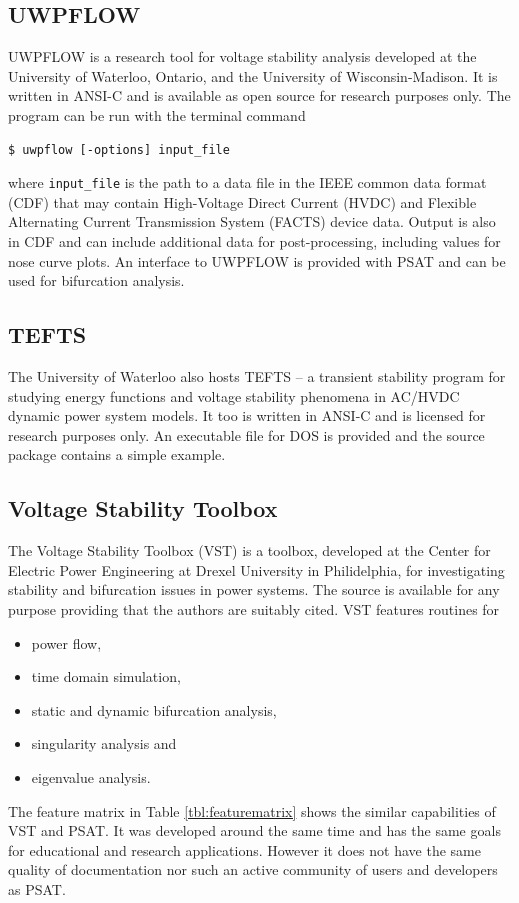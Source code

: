 \subsection*{UWPFLOW}
UWPFLOW is a research tool for voltage stability analysis developed at the
University of Waterloo, Ontario, and the University of Wisconsin-Madison.  It
is written in ANSI-C and is available as open source for research purposes
only. The program can be run with the terminal command
\begin{center}
\begin{verbatim}
$ uwpflow [-options] input_file
\end{verbatim}
\end{center}
where \texttt{input\_file} is the path to a data file in the IEEE common data
format (CDF) \cite{cdf:73} that may contain High-Voltage Direct Current (HVDC)
and Flexible Alternating Current Transmission System (FACTS) device data.
Output is also in CDF and can include additional data for post-processing,
including values for nose curve plots.  An interface to UWPFLOW is provided
with PSAT and can be used for bifurcation analysis.

\subsection*{TEFTS}
The University of Waterloo also hosts TEFTS -- a transient stability program
for studying energy functions and voltage stability phenomena in AC/HVDC
dynamic power system models.  It too is written in ANSI-C and is licensed for
research purposes only.  An executable file for DOS is provided and the source
package contains a simple example.

\subsection*{Voltage Stability Toolbox}
The Voltage Stability Toolbox (VST) is a \matlab toolbox, developed at the
Center for Electric Power Engineering at Drexel University in Philidelphia, for
investigating stability and bifurcation issues in power systems.  The source
is available for any purpose providing that the authors are suitably cited.
VST features routines for
\begin{itemize}
  \item power flow,
  \item time domain simulation,
  \item static and dynamic bifurcation analysis,
  \item singularity analysis and
  \item eigenvalue analysis.
\end{itemize}
The feature matrix in Table \ref{tbl:featurematrix} shows the similar
capabilities of VST and PSAT. It was developed around the same time and has
the same goals for educational and research applications.  However it does not
have the same quality of documentation nor such an active community of users
and developers as PSAT.

